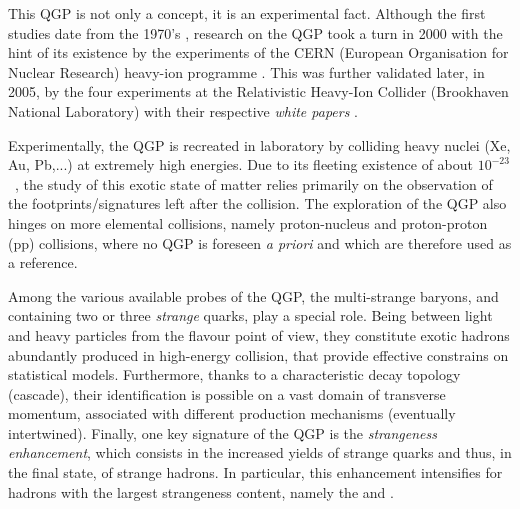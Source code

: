 This QGP is not only a concept, it is an experimental fact. Although the first studies date from the 1970's \cite{carruthersQuarkiumBizarreFermi1974}\cite{harringtonHighDensityPhaseTransitions1974}\cite{collinsSuperdenseMatterNeutrons1975}, research on the QGP took a turn in 2000 with the hint of its existence by the experiments of the CERN (European Organisation for Nuclear Research) heavy-ion programme \cite{cernNewStateMatter2023}. This was further validated later, in 2005, by the four experiments at the Relativistic Heavy-Ion Collider (Brookhaven National Laboratory) with their respective \emph{white papers} \cite{ludlamHUNTINGQUARKGLUON2005}\cite{arseneQuarkGluonPlasma2005}\cite{backPHOBOSPerspectiveDiscoveries2005}\cite{phenixcollaborationFormationDensePartonic2005}\cite{starcollaborationExperimentalTheoreticalChallenges2005}.

Experimentally, the QGP is recreated in laboratory by colliding heavy nuclei (Xe, Au, Pb,...) at extremely high energies. Due to its fleeting existence of about $10^{-23}$~\second, the study of this exotic state of matter relies primarily on the observation of the footprints/signatures left after the collision. The exploration of the QGP also hinges on more elemental collisions, namely proton-nucleus and proton-proton (pp) collisions, where no QGP is foreseen \emph{a priori} and which are therefore used as a reference.

Among the various available probes of the QGP, the multi-strange baryons, \rmXi and \rmOmega containing two or three \textit{strange} quarks, play a special role. Being between light and heavy particles from the flavour point of view, they constitute exotic hadrons abundantly produced in high-energy collision, that provide effective constrains on statistical models. Furthermore, thanks to a characteristic decay topology (cascade), their identification is possible on a vast domain of transverse momentum, associated with different production mechanisms (eventually intertwined). Finally, one key signature of the QGP is the \textit{strangeness enhancement}, which consists in the increased yields of strange quarks and thus, in the final state, of strange hadrons. In particular, this enhancement intensifies for hadrons with the largest strangeness content, namely the \rmXi and \rmOmega.\\

